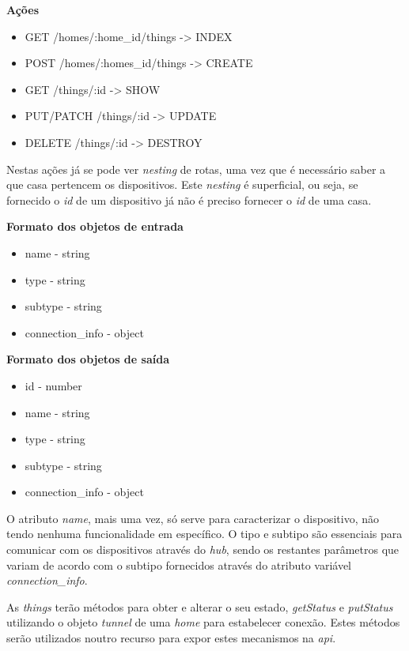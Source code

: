 \textbf{Ações}
\begin{itemize}
    \item GET /homes/:home{\_}id/things -> INDEX
    \item POST /homes/:homes{\_}id/things -> CREATE
    \item GET /things/:id -> SHOW
    \item PUT/PATCH /things/:id -> UPDATE
    \item DELETE /things/:id -> DESTROY
\end{itemize}

Nestas ações já se pode ver \textit{nesting} de rotas, uma vez que é necessário saber a que casa pertencem os dispositivos. Este \textit{nesting} é superficial, ou seja, se fornecido o \textit{id} de um dispositivo já não é preciso fornecer o \textit{id} de uma casa.

\textbf{Formato dos objetos de entrada}
\begin{itemize}
    \item name - string
    \item type - string
    \item subtype - string
    \item connection{\_}info - object
\end{itemize}

\textbf{Formato dos objetos de saída}
\begin{itemize}
    \item id - number
    \item name - string
    \item type - string
    \item subtype - string
    \item connection{\_}info - object
\end{itemize}

O atributo \textit{name}, mais uma vez, só serve para caracterizar o dispositivo, não tendo nenhuma funcionalidade em específico. O tipo e subtipo são essenciais para comunicar com os dispositivos através do \textit{hub}, sendo os restantes parâmetros que variam de acordo com o subtipo fornecidos através do atributo variável \textit{connection{\_}info}.

As \textit{things} terão métodos para obter e alterar o seu estado, \textit{getStatus} e \textit{putStatus} utilizando o objeto \textit{tunnel} de uma \textit{home} para estabelecer conexão. Estes métodos serão utilizados noutro recurso para expor estes mecanismos na \textit{api}.

